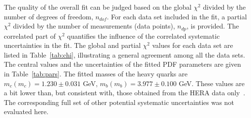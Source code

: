 \documentclass[12pt]{article}
\begin{document}
The quality of the overall fit can be judged based on the global $\chi^2$ divided by the number of degrees of freedom, $n_{dof}$. For each data set included in the fit, a partial $\chi^2$
divided by the number of measurements (data points), $n_{dp}$, is provided. The correlated part of $\chi^2$ quantifies the influence of the correlated systematic uncertainties in the fit. The global and partial $\chi^2$ values for each data set are listed in Table~\ref{tab:chi}, illustrating a general agreement among all the data sets. The central values and the uncertainties of the fitted PDF parameters are given in Table~\ref{tab:pars}. 
The fitted masses of the heavy quarks are $m_c(m_c) = 1.230 \pm 0.031$ GeV, $m_b(m_b) = 3.977 \pm 0.100$ GeV. These values are a bit lower than, but consistent with, those obtained from the HERA data only~\cite{H1:2018flt}.
The corresponding full set of other potential systematic uncertainties was not evaluated here.
\end{document}
